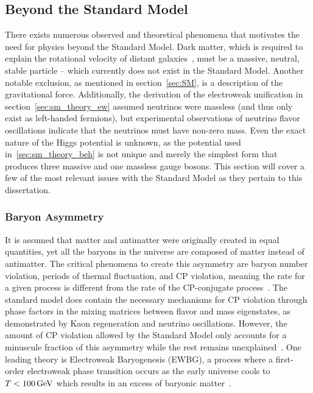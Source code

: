 \subsection{Beyond the Standard Model} \label{sec:theory_motivation}
There exists numerous observed and theoretical phenomena that motivates the need for physics beyond the Standard Model. Dark matter, which is required to explain the rotational velocity of distant galaxies~\cite{zwicky_dm}, must be a massive, neutral, stable particle -- which currently does not exist in the Standard Model. Another notable exclusion, as mentioned in section~\ref{sec:SM}, is a description of the gravitational force. Additionally, the derivation of the electroweak unification in section~\ref{sec:sm_theory_ew} assumed neutrinos were massless (and thus only exist as left-handed fermions), but experimental observations of neutrino flavor oscillations indicate that the neutrinos must have non-zero mass. Even the exact nature of the Higgs potential is unknown, as the potential used in~\ref{sec:sm_theory_beh} is not unique and merely the simplest form that produces three massive and one massless gauge bosons. This section will cover a few of the most relevant issues with the Standard Model as they pertain to this dissertation.

\subsubsection{Baryon Asymmetry} \label{sec:baryon_asymmetry}
It is assumed that matter and antimatter were originally created in equal quantities, yet all the baryons in the universe are composed of matter instead of antimatter. The critical phenomena to create this asymmetry are baryon number violation, periods of thermal fluctuation, and CP violation, meaning the rate for a given process is different from the rate of the CP-conjugate process~\cite{Sakharov:1967dj}. The standard model does contain the necessary mechanisms for CP violation through phase factors in the mixing matrices between flavor and mass eigenstates, as demonstrated by Kaon regeneration and neutrino oscillations. However, the amount of CP violation allowed by the Standard Model only accounts for a minuscule fraction of this asymmetry while the rest remains unexplained~\cite{Peskin2002}. One leading theory is Electroweak Baryogenesis (EWBG), a process where a first-order electroweak phase transition occurs as the early universe cools to $T<100\,\text{Ge\hspace{-.08em}V}$ which results in an excess of baryonic matter~\cite{ewbg1,ewbg2}.

